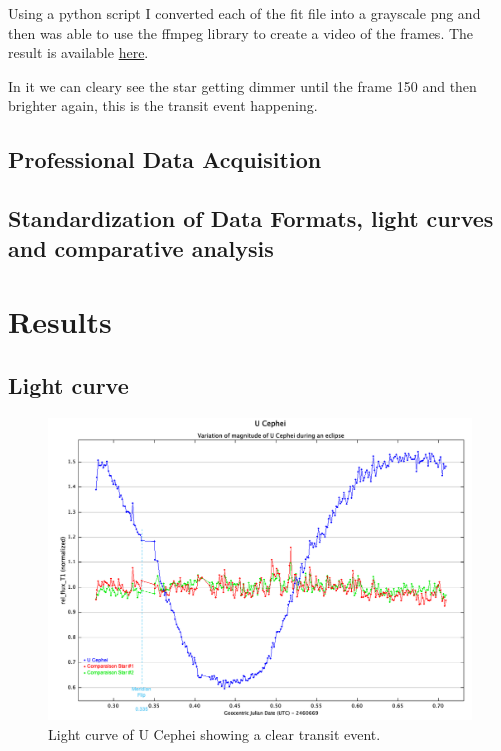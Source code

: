 \documentclass[12pt,a4paper]{article}
\begin{document}
\bigskip

Using a python script I converted each of the fit file into a grayscale png and then was able to use the ffmpeg library to create a video of the frames.
The result is available \href{https://youtube.com/shorts/rVnEccCb3Aw}{here}.

In it we can cleary see the star getting dimmer until the frame 150 and then brighter again, this is the transit event happening.

\subsection{Professional Data Acquisition}

\subsection{Standardization of Data Formats, light curves and comparative analysis}

\section{Results}

\subsection{Light curve}

\begin{figure}[H]
    \centering
    \includegraphics[width=1\textwidth]{assets/Measurements.png}
    \caption{Light curve of U Cephei showing a clear transit event.}
    \label{fig:light_curve}
\end{figure}
\end{document}
